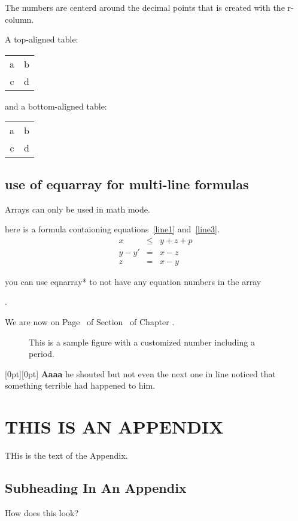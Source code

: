 \documentclass[12pt,twoside,leqno]{article}%
\begin{document}
The numbers are centerd around the decimal points that is created with the r- column.

A top-aligned table:
\begin{tabular}[t]{cc}
a & b \\
c & d
\end{tabular}
and a bottom-aligned table:
\begin{tabular}[b]{cc}
a & b \\
c & d
\end{tabular}
\subsection{use of equarray for multi-line formulas}
Arrays can only be used in math mode.

here is a formula contaioning equations~\ref{line1} and~\ref{line3}.
\begin{eqnarray}
x& \leq &y+z+p \label{line1}\\
y-y'&=&x-z \nonumber\\
z&=&x-y \label{line3}
\end{eqnarray}

you can use eqnarray* to not have any equation numbers in the array

.

We are now on Page \thepage\ of Section \thesection\ of Chapter \thechapter.

\renewcommand{\thefigure}{\arabic{chapter}.\Alph{figure}}
\setcounter{chapter}{2}
\setcounter{figure}{3}
\begin{figure}[ht]%
\vspace{.5in}
\caption{This is a sample figure with a customized number including a period.}
\end{figure}
\raisebox{0pt}[0pt][0pt]{\large%
\textbf{Aaaa\raisebox{-0.3ex}{a}%
\raisebox{-0.7ex}{aa}%
\raisebox{-1.2ex}{r}%
\raisebox{-2.2ex}{g}%
\raisebox{-4.5ex}{h}}}
he shouted but not even the next one in line noticed that something terrible had happened to him.
\appendix
\section{THIS IS AN APPENDIX}
THis is the text of the Appendix.
\subsection {Subheading In An Appendix}
How does this look?
\end{document}
